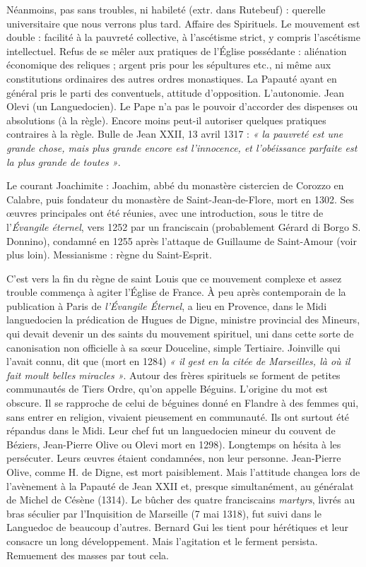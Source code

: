 \documentclass[french,twoside]{book} %
\def\bignobreak{\ifdim\lastskip<\bigskipamount
  \removelastskip\nopagebreak\bigskip\fi}
\newcommand{\labelblock}[1]{\bigskip{\color{rubric}\bfseries\centering #1\par}\bignobreak}
\begin{document}
\labelblock{Les Tiers Ordres.}

\noindent Néanmoins, pas sans troubles, ni habileté (extr. dans Rutebeuf) : querelle universitaire que nous verrons plus tard. Affaire des Spirituels. Le mouvement est double : facilité à la pauvreté collective, à l’ascétisme strict, y compris l’ascétisme intellectuel. Refus de se mêler aux pratiques de l’Église possédante : aliénation  
\label{p112} économique des reliques ; argent pris pour les sépultures etc., ni même aux constitutions ordinaires des autres ordres monastiques. La Papauté ayant en général pris le parti des conventuels, attitude d’opposition. L’autonomie. Jean Olevi (un Languedocien). Le Pape n’a pas le pouvoir d’accorder des dispenses ou absolutions (à la règle). Encore moins peut-il autoriser quelques pratiques contraires à la règle. Bulle de Jean XXII, 13 avril 1317 : \emph{« la pauvreté est une grande chose, mais plus grande encore est l’innocence, et l’obéissance parfaite est la plus grande de toutes »}.\par
Le courant Joachimite : Joachim, abbé du monastère cistercien de Corozzo en Calabre, puis fondateur du monastère de Saint-Jean-de-Flore, mort en 1302. Ses œuvres principales ont été réunies, avec une introduction, sous le titre de l’{\itshape Évangile éternel}, vers 1252 par un franciscain (probablement Gérard di Borgo S. Donnino), condamné en 1255 après l’attaque de Guillaume de Saint-Amour (voir plus loin). Messianisme : règne du Saint-Esprit.\par
C’est vers la fin du règne de saint Louis que ce mouvement complexe et assez trouble commença à agiter l’Église de France. À peu après contemporain de la publication à Paris de \emph{l’Évangile Éternel}, a lieu en Provence, dans le Midi languedocien la prédication de Hugues de Digne, ministre provincial des Mineurs, qui devait devenir un des saints du mouvement spirituel, uni dans cette sorte de canonisation non officielle à sa sœur Douceline, simple Tertiaire. Joinville qui l’avait connu, dit que (mort en 1284) \emph{« il gest en la citée de Marseilles, là où il fait moult belles miracles »}. Autour des frères spirituels se forment de petites communautés de Tiers Ordre, qu’on appelle Béguins. L’origine du mot est obscure. Il se rapproche de celui de béguines donné en Flandre à des femmes qui, sans entrer en religion, vivaient pieusement en communauté. Ils ont surtout été répandus dans le Midi. Leur chef fut un languedocien mineur du couvent de Béziers, Jean-Pierre Olive ou Olevi mort en 1298). Longtemps on hésita à les persécuter. Leurs œuvres étaient condamnées, non leur personne. Jean-Pierre Olive, comme H. de Digne, est mort paisiblement. Mais l’attitude changea lors de l’avènement à la Papauté de Jean XXII et, presque simultanément, au généralat de Michel de Césène (1314). Le bûcher des quatre franciscains \emph{martyrs}, livrés au bras séculier par l’Inquisition de Marseille (7 mai 1318), fut suivi dans le Languedoc de beaucoup d’autres. Bernard Gui les tient pour hérétiques et leur consacre un long développement. Mais l’agitation et le ferment persista. Remuement des masses par tout cela.
\end{document}
